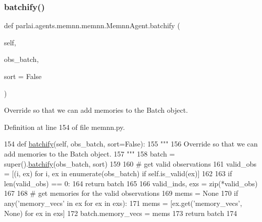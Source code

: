 \subsubsection{\texorpdfstring{batchify()}{batchify()}}
{\footnotesize\ttfamily def parlai.\+agents.\+memnn.\+memnn.\+Memnn\+Agent.\+batchify (\begin{DoxyParamCaption}\item[{}]{self,  }\item[{}]{obs\+\_\+batch,  }\item[{}]{sort = {\ttfamily False} }\end{DoxyParamCaption})}

\begin{DoxyVerb}Override so that we can add memories to the Batch object.
\end{DoxyVerb}
 

Definition at line 154 of file memnn.\+py.


\begin{DoxyCode}
154     \textcolor{keyword}{def }\hyperlink{namespaceparlai_1_1agents_1_1drqa_1_1utils_aca22dd97c5b6dcda2a7479c1cb22ef1e}{batchify}(self, obs\_batch, sort=False):
155         \textcolor{stringliteral}{"""}
156 \textcolor{stringliteral}{        Override so that we can add memories to the Batch object.}
157 \textcolor{stringliteral}{        """}
158         batch = super().\hyperlink{namespaceparlai_1_1agents_1_1drqa_1_1utils_aca22dd97c5b6dcda2a7479c1cb22ef1e}{batchify}(obs\_batch, sort)
159 
160         \textcolor{comment}{# get valid observations}
161         valid\_obs = [(i, ex) \textcolor{keywordflow}{for} i, ex \textcolor{keywordflow}{in} enumerate(obs\_batch) \textcolor{keywordflow}{if} self.is\_valid(ex)]
162 
163         \textcolor{keywordflow}{if} len(valid\_obs) == 0:
164             \textcolor{keywordflow}{return} batch
165 
166         valid\_inds, exs = zip(*valid\_obs)
167 
168         \textcolor{comment}{# get memories for the valid observations}
169         mems = \textcolor{keywordtype}{None}
170         \textcolor{keywordflow}{if} any(\textcolor{stringliteral}{'memory\_vecs'} \textcolor{keywordflow}{in} ex \textcolor{keywordflow}{for} ex \textcolor{keywordflow}{in} exs):
171             mems = [ex.get(\textcolor{stringliteral}{'memory\_vecs'}, \textcolor{keywordtype}{None}) \textcolor{keywordflow}{for} ex \textcolor{keywordflow}{in} exs]
172         batch.memory\_vecs = mems
173         \textcolor{keywordflow}{return} batch
174 
\end{DoxyCode}
\mbox{\label{classparlai_1_1agents_1_1memnn_1_1memnn_1_1MemnnAgent_af314871636896b61139ef761765a1872}} 
